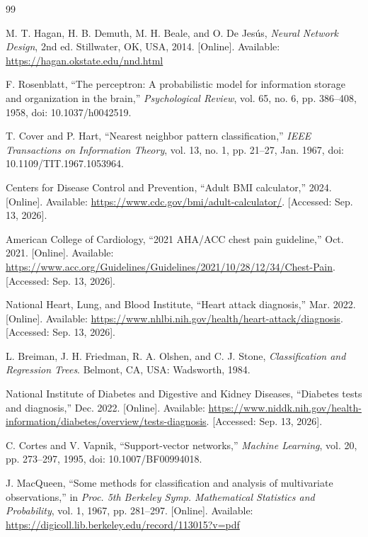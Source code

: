 \documentclass[12pt,a4paper,openany]{report}
\begin{document}
\begin{thebibliography}{99}

\ifdefined\AssignmentVersion
{}
M. T. Hagan, H. B. Demuth, M. H. Beale, and O. De Jes\'{u}s,
\emph{Neural Network Design}, 2nd ed. Stillwater, OK, USA, 2014. [Online].
Available: \url{https://hagan.okstate.edu/nnd.html}

F. Rosenblatt, ``The perceptron: A probabilistic model for information storage
and organization in the brain,'' \emph{Psychological Review}, vol. 65, no. 6,
pp. 386--408, 1958, doi: 10.1037/h0042519.

\else
{}
T. Cover and P. Hart, ``Nearest neighbor pattern classification,''
\emph{IEEE Transactions on Information Theory}, vol. 13, no. 1, pp. 21--27,
Jan. 1967, doi: 10.1109/TIT.1967.1053964.

Centers for Disease Control and Prevention, ``Adult BMI calculator,'' 2024.
[Online]. Available: \url{https://www.cdc.gov/bmi/adult-calculator/}.
[Accessed: Sep. 13, 2026].

American College of Cardiology, ``2021 AHA/ACC chest pain guideline,'' Oct.
2021. [Online]. Available:
\url{https://www.acc.org/Guidelines/Guidelines/2021/10/28/12/34/Chest-Pain}.
[Accessed: Sep. 13, 2026].

National Heart, Lung, and Blood Institute, ``Heart attack diagnosis,'' Mar.
2022. [Online]. Available:
\url{https://www.nhlbi.nih.gov/health/heart-attack/diagnosis}.
[Accessed: Sep. 13, 2026].

L. Breiman, J. H. Friedman, R. A. Olshen, and C. J. Stone,
\emph{Classification and Regression Trees}. Belmont, CA, USA: Wadsworth,
1984.

National Institute of Diabetes and Digestive and Kidney Diseases, ``Diabetes
tests and diagnosis,'' Dec. 2022. [Online]. Available:
\url{https://www.niddk.nih.gov/health-information/diabetes/overview/tests-diagnosis}.
[Accessed: Sep. 13, 2026].

C. Cortes and V. Vapnik, ``Support-vector networks,'' \emph{Machine Learning},
vol. 20, pp. 273--297, 1995, doi: 10.1007/BF00994018.

J. MacQueen, ``Some methods for classification and analysis of multivariate
observations,'' in \emph{Proc. 5th Berkeley Symp. Mathematical Statistics and
Probability}, vol. 1, 1967, pp. 281--297. [Online]. Available:
\url{https://digicoll.lib.berkeley.edu/record/113015?v=pdf}


\end{thebibliography}
\end{document}
